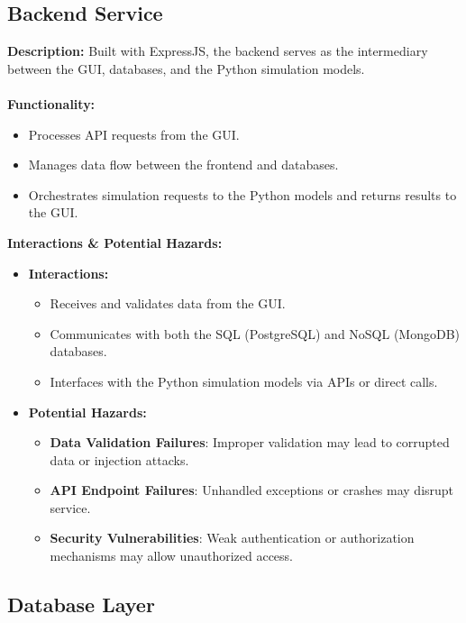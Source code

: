 \documentclass{article}
\begin{document}
\subsection{Backend Service}

\textbf{Description:}
Built with ExpressJS, the backend serves as the intermediary between the GUI, databases, and the Python simulation models.
\\\\
\textbf{Functionality:}
\begin{itemize}
    \item Processes API requests from the GUI.
    \item Manages data flow between the frontend and databases.
    \item Orchestrates simulation requests to the Python models and returns results to the GUI.
\end{itemize}

\textbf{Interactions \& Potential Hazards:}
\begin{itemize}
    \item \textbf{Interactions:}
    \begin{itemize}
        \item Receives and validates data from the GUI.
        \item Communicates with both the SQL (PostgreSQL) and NoSQL (MongoDB) databases.
        \item Interfaces with the Python simulation models via APIs or direct calls.
    \end{itemize}
    \item \textbf{Potential Hazards:}
    \begin{itemize}
        \item \textbf{Data Validation Failures}: Improper validation may lead to corrupted data or injection attacks.
        \item \textbf{API Endpoint Failures}: Unhandled exceptions or crashes may disrupt service.
        \item \textbf{Security Vulnerabilities}: Weak authentication or authorization mechanisms may allow unauthorized access.
    \end{itemize}
\end{itemize}

\subsection{Database Layer}
\end{document}
